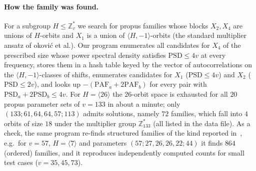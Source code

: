 \documentclass[11pt]{article}
\numberwithin{equation}{section}
\theoremstyle{definition}
\theoremstyle{remark}
\newcommand{\Z}{\mathbb Z}
\newcommand{\PAF}{\mathrm{PAF}}
\newcommand{\PSD}{\mathrm{PSD}}
\begin{document}
\paragraph{How the family was found.}
For a subgroup $H\le\Z_v^{*}$ we search for propus families whose blocks $X_2,X_4$ are unions of
$H$-orbits and $X_1$ is a union of $\langle H,-1\rangle$-orbits (the standard multiplier ansatz of
\DJ{}okovi\'c et al.). Our program enumerates all candidates for $X_4$ of the prescribed size whose power
spectral density satisfies $\PSD\le4v$ at every frequency, stores them in a hash table keyed by the
vector of autocorrelations on the $\langle H,-1\rangle$-classes of shifts, enumerates candidates for
$X_1$ ($\PSD\le4v$) and $X_2$ ($\PSD\le2v$), and looks up $-(\PAF_a+2\PAF_b)$ for every pair with
$\PSD_a+2\PSD_b\le4v$. For $H=\langle26\rangle$ the $26$-orbit space is exhausted for all $20$ propus
parameter sets of $v=133$ in about a minute; only $(133;61,64,64,57;113)$ admits solutions, namely
$72$ families, which fall into $4$ orbits of size $18$ under the multiplier group $\Z_{133}^{*}$ (all
listed in the data file). As a check, the same program re-finds structured families of the kind
reported in~\cite{Dj22}, e.g.\ for $v=57$, $H=\langle7\rangle$ and parameters $(57;27,26,26,22;44)$ it
finds $864$ (ordered) families, and it reproduces independently computed counts for small test cases
($v=35,45,73$).
\end{document}
